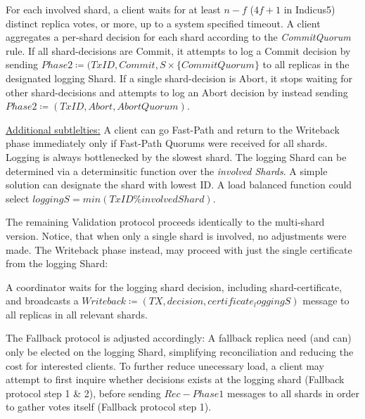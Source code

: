 For each involved shard, a client waits for at least $n-f$ ($4f+1$ in Indicus5) distinct replica votes, or more, up to a system specified timeout. A client aggregates a per-shard decision for each shard according to the \textit{CommitQuorum} rule. If all shard-decisions are Commit, it attempts to log a Commit decision by sending $Phase2 \coloneqq (TxID, Commit, S \times \{CommitQuorum\}$ to all replicas in the designated logging Shard. If a single shard-decision is Abort, it stops waiting for other shard-decisions and attempts to log an Abort decision by instead sending $Phase2 \coloneqq (TxID, Abort, AbortQuorum)$. 

\underline{Additional subtlelties:} A client can go Fast-Path and return to the Writeback phase immediately only if Fast-Path Quorums were received for all shards. Logging is always bottlenecked by the slowest shard. The logging Shard can be determined via a determinsitic function over the \textit{involved Shards}. A simple solution can designate the shard with lowest ID. A load balanced function could select $loggingS = min(TxID \% involvedShard)$.

The remaining Validation protocol proceeds identically to the multi-shard version. Notice, that when only a single shard is involved, no adjustments were made. The Writeback phase instead, may proceed with just the single certificate from the logging Shard: 

A coordinator waits for the logging shard decision, including shard-certificate, and broadcasts a $Writeback \coloneqq (TX, decision, certificate_loggingS )$ message to all replicas in all relevant shards.

The Fallback protocol is adjusted accordingly: A fallback replica need (and can) only be elected on the logging Shard, simplifying reconciliation and reducing the cost for interested clients. 
To further reduce unecessary load, a client may attempt to first inquire whether decisions exists at the logging shard (Fallback protocol step 1 & 2), before sending $Rec-Phase1$ messages to all shards in order to gather votes itself (Fallback protocol step 1). 


